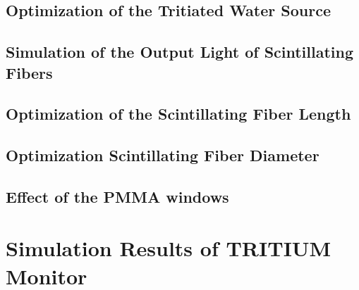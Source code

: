 \documentclass[12pt,a4paper]{book}
\begin{document}
			\subsection[Optimization of the Tritiated Water Source]{Optimization of the Tritiated Water Source}\label{subsec:ResultsShapeSource}
			
		
			\subsection{Simulation of the Output Light of Scintillating Fibers}\label{subsec:ResultsOutputLight}
			
			
			\subsection[Optimization of the Scintillating Fiber Length]{Optimization of the Scintillating Fiber Length}\label{subsec:ResultsFiberLength}
			
		
			\subsection[Optimization Scintillating Fiber Diameter]{Optimization Scintillating Fiber Diameter}\label{subsec:ResultsFiberDiameter}
			
		
			\subsection[Effect of the PMMA windows]{Effect of the PMMA windows}\label{subsec:ResultsPMMAWindows}
			
		
		\section[Simulation Results of TRITIUM Monitor]{Simulation Results of TRITIUM Monitor}\label{sec:ResultsSimulatedTRITIUMmonitor}
		
		
\end{document}
